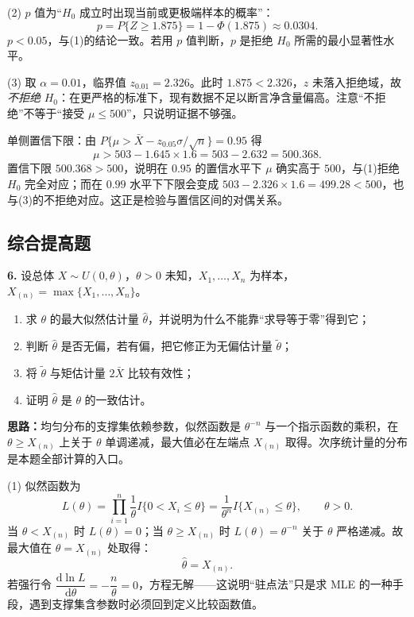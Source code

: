 (2) $p$ 值为“$H_0$ 成立时出现当前或更极端样本的概率”：
\[
p=P\{Z\geqslant1.875\}=1-\Phi(1.875)\approx0.0304 .
\]
$p<0.05$，与(1)的结论一致。若用 $p$ 值判断，$p$ 是拒绝 $H_0$ 所需的最小显著性水平。

(3) 取 $\alpha=0.01$，临界值 $z_{0.01}=2.326$。此时 $1.875<2.326$，$z$ 未落入拒绝域，故\emph{不拒绝} $H_0$：在更严格的标准下，现有数据不足以断言净含量偏高。注意“不拒绝”不等于“接受 $\mu\leqslant500$”，只说明证据不够强。

单侧置信下限：由 $P\{\mu>\bar X-z_{0.05}\sigma/\sqrt{n}\}=0.95$ 得
\[
\mu>503-1.645\times1.6=503-2.632=500.368 .
\]
置信下限 $500.368>500$，说明在 $0.95$ 的置信水平下 $\mu$ 确实高于 $500$，与(1)拒绝 $H_0$ 完全对应；而在 $0.99$ 水平下下限会变成 $503-2.326\times1.6=499.28<500$，也与(3)的不拒绝对应。这正是检验与置信区间的对偶关系。


\else \answerarea[10] \fi%
\subsection{综合提高题}

\textbf{6.} 设总体 $X\sim U(0,\theta)$，$\theta>0$ 未知，$X_1,\ldots,X_n$ 为样本，$X_{(n)}=\max\{X_1,\ldots,X_n\}$。
\begin{enumerate}[label=(\arabic*)]
    \item 求 $\theta$ 的最大似然估计量 $\widehat\theta$，并说明为什么不能靠“求导等于零”得到它；
    \item 判断 $\widehat\theta$ 是否无偏，若有偏，把它修正为无偏估计量 $\widetilde\theta$；
    \item 将 $\widetilde\theta$ 与矩估计量 $2\bar X$ 比较有效性；
    \item 证明 $\widehat\theta$ 是 $\theta$ 的一致估计。
\end{enumerate}

\ifshowsolutions%
\textbf{思路：}均匀分布的支撑集依赖参数，似然函数是 $\theta^{-n}$ 与一个指示函数的乘积，在 $\theta\geqslant X_{(n)}$ 上关于 $\theta$ 单调递减，最大值必在左端点 $X_{(n)}$ 取得。次序统计量的分布是本题全部计算的入口。

(1) 似然函数为
\[
L(\theta)=\prod_{i=1}^{n}\frac{1}{\theta}I\{0<X_i\leqslant\theta\}
=\frac{1}{\theta^{n}}I\{X_{(n)}\leqslant\theta\},\qquad \theta>0 .
\]
当 $\theta<X_{(n)}$ 时 $L(\theta)=0$；当 $\theta\geqslant X_{(n)}$ 时 $L(\theta)=\theta^{-n}$ 关于 $\theta$ 严格递减。故最大值在 $\theta=X_{(n)}$ 处取得：
\[
\widehat\theta=X_{(n)} .
\]
若强行令 $\dfrac{\mathrm{d}\ln L}{\mathrm{d}\theta}=-\dfrac{n}{\theta}=0$，方程无解——这说明“驻点法”只是求 MLE 的一种手段，遇到支撑集含参数时必须回到定义比较函数值。

